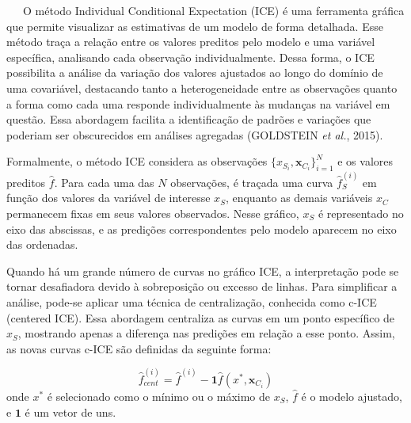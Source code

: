 \documentclass[
  12pt,
  a4paper,
]{scrreprt}
\begin{document}
~~~O método Individual Conditional Expectation (ICE) é uma ferramenta
gráfica que permite visualizar as estimativas de um modelo de forma
detalhada. Esse método traça a relação entre os valores preditos pelo
modelo e uma variável específica, analisando cada observação
individualmente. Dessa forma, o ICE possibilita a análise da variação
dos valores ajustados ao longo do domínio de uma covariável, destacando
tanto a heterogeneidade entre as observações quanto a forma como cada
uma responde individualmente às mudanças na variável em questão. Essa
abordagem facilita a identificação de padrões e variações que poderiam
ser obscurecidos em análises agregadas (GOLDSTEIN \emph{et al.}, 2015).

\vspace{12pt}

Formalmente, o método ICE considera as observações
\(\{x_{S_i}, \mathbf{x}_{C_i}\}_{i=1}^{N}\)\hspace{0pt} e os valores
preditos \(\hat f\)\hspace{0pt}. Para cada uma das \(N\) observações, é
traçada uma curva \(\hat f_S^{\left(i\right)}\)\hspace{0pt} em função
dos valores da variável de interesse \(x_S\)\hspace{0pt}, enquanto as
demais variáveis \(x_C\)\hspace{0pt} permanecem fixas em seus valores
observados. Nesse gráfico, \(x_S\)\hspace{0pt} é representado no eixo
das abscissas, e as predições correspondentes pelo modelo aparecem no
eixo das ordenadas.

\vspace{12pt}

Quando há um grande número de curvas no gráfico ICE, a interpretação
pode se tornar desafiadora devido à sobreposição ou excesso de linhas.
Para simplificar a análise, pode-se aplicar uma técnica de
centralização, conhecida como c-ICE (centered ICE). Essa abordagem
centraliza as curvas em um ponto específico de \(x_S\)\hspace{0pt},
mostrando apenas a diferença nas predições em relação a esse ponto.
Assim, as novas curvas c-ICE são definidas da seguinte forma:

\[
\hat{f}_{cent}^{\left(i\right)} = \hat{f}^{\left(i\right)} - \mathbf{1} \hat{f}\left(x^*, \mathbf x_{C_i}\right)
\] onde \(x^*\) é selecionado como o mínimo ou o máximo de
\(x_S\)\hspace{0pt}, \(\hat f\)\hspace{0pt} é o modelo ajustado, e
\(\mathbf 1\) é um vetor de uns.
\end{document}
